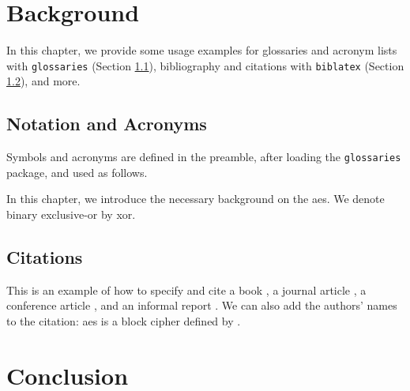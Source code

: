 \documentclass[11pt,
  oneside,openany,    %
]{scrreprt}
\begin{document}
\chapter{Background}
\label{chap:background}

In this chapter, we provide some usage examples for
glossaries and acronym lists with \texttt{glossaries} (Section \ref{sec:gloss}),
bibliography and citations with \texttt{biblatex} (Section \ref{sec:bib}), and more.

\section{Notation and Acronyms}
\label{sec:gloss}

Symbols and acronyms are defined in the preamble, after loading the \texttt{glossaries} package, and used as follows.

In this chapter, we introduce the necessary background on the \gls{aes}.
We denote binary exclusive-or by \gls{xor}.

\section{Citations}
\label{sec:bib}

This is an example of how to specify and cite
a book \cite{AESbook},
a journal article \cite{bstjShannon49},
a conference article \cite{spKocherHFGGHHLM019},
and an informal report \cite{iacrSchneierFKR15}.
We can also add the authors' names to the citation:
\Gls{aes} is a block cipher defined by \textcite{AESbook}.


\chapter{Conclusion}
\label{chap:conclusion}

\Blindtext[3]





\printbibliography[heading=bibintoc]
\end{document}
